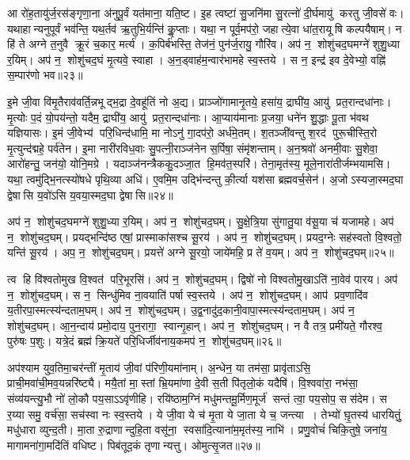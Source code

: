 आ रो॑ह॒तायु॑र्ज॒रस॑ङ्गृणा॒ना अ॑नुपू॒र्वं यत॑माना॒ यति॒ष्ट। इ॒ह त्वष्टा॑ सु॒जनि॑मा सु॒रत्नो॑ दी॒र्घमायु॑ करतु जी॒वसे॑ वः। यथाहान्यनुपूर्वं भव॑न्ति॒ यथ॒र्तव॑ ऋ॒तुभि॒र्यन्ति॑ कॢ॒प्ताः। यथा॒ न पूर्व॒मप॑रो॒ जहात्ये॒वा धा॑त॒रायूषि कल्पयैषाम्। न हि॑ ते अग्ने त॒नुवै क्रू॒रं च॒कार॒ मर्त्य॑। क॒पिर्ब॑भस्ति॒ तेज॑नं॒ पुन॑र्ज॒रायु॒ गौरि॑व। अप॑ न॒ शोशु॑चद॒घमग्ने॑ शुशु॒ध्या र॒यिम्। अप॑ न॒ शोशु॑चद॒घं मृ॒त्यवे॒ स्वाहा। अ॒न॒ड्वाह॑म॒न्वार॑भामहे स्व॒स्तये। स न॒ इन्द्र॑ इव दे॒वेभ्यो॒ वह्नि॑ स॒म्पार॑णो भव॥२३॥

इ॒मे जी॒वा वि॑मृ॒तैराव॑वर्ति॒न्नभूद्भ॒द्रा दे॒वहू॑तिं नो अ॒द्य। प्राञ्जो॑गामानृ॒तये॒ हसा॑य॒ द्राघी॑य॒ आयु॑ प्रत॒रान्दधा॑नाः। मृ॒त्योः प॒दं यो॒पय॑न्तो॒ यदैम॒ द्राघी॑य॒ आयु॑ प्रत॒रान्दधा॑नाः। आ॒प्याय॑मानाः प्र॒जया॒ धने॑न शु॒द्धाः पू॒ता भ॑वथ यज्ञियासः। इ॒मं जी॒वेभ्य॑ परि॒धिन्द॑धामि॒ मा नोऽनु॑ गा॒दप॑रो॒ अर्ध॑मे॒तम्। श॒तञ्जी॑वन्तु श॒रद॑ पुरू॒चीस्ति॒रो मृ॒त्युन्द॑द्महे॒ पर्व॑तेन। इ॒मा नारी॑रविध॒वाः सु॒पत्नी॒राञ्ज॑नेन स॒र्पिषा॒ संमृ॑शन्ताम्। अ॒न॒श्रवो॑ अनमी॒वाः सु॒शेवा॒ आरो॑हन्तु॒ जन॑यो॒ योनि॒मग्रे। यदाञ्ज॑नन्त्रैककु॒दञ्जा॒त हि॒मव॑त॒स्परि॑। तेना॒मृत॑स्य॒ मूले॒नारा॑तीर्जम्भयामसि। यथा॒ त्वमु॑द्भि॒नत्स्यो॑षधे पृथि॒व्या अधि॑। ए॒वमि॒म उद्भि॑न्दन्तु की॒र्त्या यश॑सा ब्रह्मवर्च॒सेन॑। अ॒जोऽस्यजा॒स्मद॒घा द्वेषासि य॒वो॑ऽसि य॒वया॒स्मद॒घा द्वेषासि॥२४॥
\anuvakamend[भ॒व॒ ज॒म्भ॒या॒म॒सि॒ त्रीणि॑ च]

अप॑ न॒ शोशु॑चद॒घमग्ने॑ शुशु॒ध्या र॒यिम्। अप॑ न॒ शोशु॑चद॒घम्। सु॒क्षे॒त्रि॒या सु॑गातु॒या व॑सू॒या च॑ यजामहे। अप॑ न॒ शोशु॑चद॒घम्। प्रयद्भन्दि॑ष्ठ एषां॒ प्रास्माका॑सश्च सू॒रय॑। अप॑ न॒ शोशु॑चद॒घम्। प्रयद॒ग्नेः सह॑स्वतो वि॒श्वतो॒ यन्ति॑ सू॒रय॑। अप॒ न॒ शोशु॑चद॒घम्। प्रयत्ते॑ अग्ने सू॒रयो॒ जाये॑महि॒ प्र ते॑ व॒यम्। अप॑ न॒ शोशु॑चद॒घम्॥२५॥

त्व हि वि॑श्वतोमुख वि॒श्वत॑ परि॒भूरसि॑। अप॑ न॒ शोशु॑चद॒घम्। द्विषो॑ नो विश्वतोमु॒खाऽति॑ ना॒वेव॑ पारय। अप॑ न॒ शोशु॑चद॒घम्। स न॒ सिन्धु॑मिव ना॒वयाति॑ पर्\mbox{}षा स्व॒स्तये। अप॑ न॒ शोशु॑चद॒घम्। आप॑ प्रव॒णादि॑व य॒तीरपा॒स्मत्स्य॑न्दताम॒घम्। अप॑ न॒ शोशु॑चद॒घम्। उ॒द्व॒नादु॑द॒कानी॒वापा॒स्मत्स्य॑न्दताम॒घम्। अप॑ न॒ शोशु॑चद॒घम्। आ॒न॒न्दाय॑ प्रमो॒दाय॒ पुन॒रागा॒ स्वान्गृ॒हान्। अप॑ न॒ शोशु॑चद॒घम्। न वै तत्र॒ प्रमी॑यते॒ गौरश्व॒ पुरु॑षः प॒शुः। यत्रे॒दं ब्रह्म॑ क्रि॒यते॑ परि॒धिर्जीव॑नाय॒कमप॑ न॒ शोशु॑चद॒घम्॥२६॥
\anuvakamend[अ॒घम॒घं च॒त्वारि॑ च]

अप॑श्याम युव॒तिमा॒चर॑न्तीं मृ॒ताय॑ जी॒वां प॑रिणी॒यमा॑नाम्। अ॒न्धेन॒ या तम॑सा॒ प्रावृ॑ताऽसि॒ प्राची॒मवा॑ची॒मव॒यन्नरि॑ष्ट्यै। मयै॒तां मा॒स्तां भ्रि॒यमा॑णा दे॒वी स॒ती पि॑तृलो॒कं यदैषि॑। वि॒श्ववा॑रा॒ नभ॑सा॒ संव्य॑यन्त्यु॒भौ नो॑ लो॒कौ पय॒साऽऽवृ॑णीहि। रयि॑ष्ठाम॒ग्निं मधु॑मन्तमू॒र्मिण॒मूर्ज॑ सन्तं त्वा॒ पय॒सोप॒ सस॑देम। स र॒य्या समु॒ वर्च॑सा॒ सच॑स्वा नः स्व॒स्तये। ये जी॒वा ये च॑ मृ॒ता ये जा॒ता ये च॒ जन्त्या। तेभ्यो॑ घ़ृ॒तस्य॑ धारयितुं॒ मधु॑धारा व्युन्द॒ती। मा॒ता रु॒द्राणान्दुहि॒ता वसू॑ना॒ स्वसा॑दि॒त्याना॑म॒मृत॑स्य॒ नाभि॑। प्रणु॒वोचं॑ चिकि॒तुषे॒ जना॑य॒ मागामना॑गा॒मदि॑तिं वधिष्ट। पिब॑तूद॒कं तृणान्यत्तु। ओमुत्सृ॒जत॥२७॥
\anuvakamend[व॒धि॒ष्ट॒ द्वे च॑]

